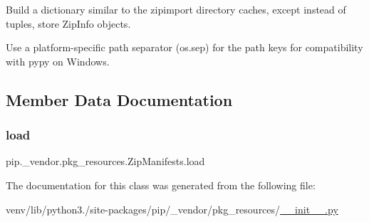 \begin{DoxyVerb}Build a dictionary similar to the zipimport directory
caches, except instead of tuples, store ZipInfo objects.

Use a platform-specific path separator (os.sep) for the path keys
for compatibility with pypy on Windows.
\end{DoxyVerb}
 

\subsection{Member Data Documentation}
\mbox{\label{classpip_1_1__vendor_1_1pkg__resources_1_1ZipManifests_acb75d7d7f6ac948265a06e161a414cee}} 
\subsubsection{\texorpdfstring{load}{load}}
{\footnotesize\ttfamily pip.\+\_\+vendor.\+pkg\+\_\+resources.\+Zip\+Manifests.\+load\hspace{0.3cm}{\ttfamily [static]}}



The documentation for this class was generated from the following file\+:\begin{DoxyCompactItemize}
\item 
venv/lib/python3./site-\/packages/pip/\+\_\+vendor/pkg\+\_\+resources/\hyperlink{venv_2lib_2python3_89_2site-packages_2pip_2__vendor_2pkg__resources_2____init_____8py}{\+\_\+\+\_\+init\+\_\+\+\_\+.\+py}\end{DoxyCompactItemize}
